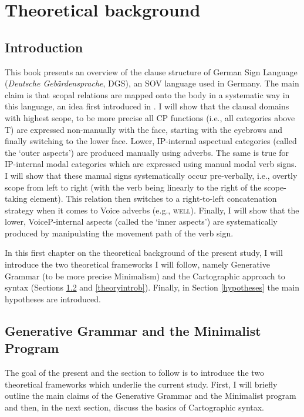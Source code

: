 \chapter{Theoretical background}\label{chaptertheoreticalbackground}
\section{Introduction}
This book presents an overview of the clause structure of German Sign Language (\textit{Deutsche Gebärdensprache}, DGS), an SOV language used in Germany. The main claim is that scopal relations are mapped onto the body in a systematic way in this language, an idea first introduced in \citet{bross2017scope}. I will show that the clausal domains with highest scope, to be more precise all CP functions (i.e., all categories above T) are expressed non-manually with the face, starting with the eyebrows and finally switching to the lower face. Lower, IP-internal aspectual categories (called the `outer aspects') are produced manually using adverbs. The same is true for IP-internal modal categories which are expressed using manual modal verb signs. I will show that these manual signs systematically occur pre-verbally, i.e., overtly scope from left to right (with the verb being linearly to the right of the scope-taking element). This relation then switches to a right-to-left concatenation strategy when it comes to Voice adverbs (e.g., \textsc{well}). Finally, I will show that the lower, VoiceP-internal aspects (called the `inner aspects') are systematically produced by manipulating the movement path of the verb sign. 

In this first chapter on the theoretical background of the present study, I will introduce the two theoretical frameworks I will follow, namely Generative Grammar (to be more precise Minimalism) and the Cartographic approach to syntax (Sections \ref{theoryintroa} and \ref{theoryintrob}). Finally, in Section \ref{hypotheses} the main hypotheses are introduced.%



\section{Generative Grammar and the Minimalist Program}\label{theoryintroa}
The goal of the present and the section to follow is to introduce the two theoretical frameworks which underlie the current study. First, I will briefly outline the main claims of the Generative Grammar and the Minimalist program and then, in the next section, discuss the basics of Cartographic syntax. 

